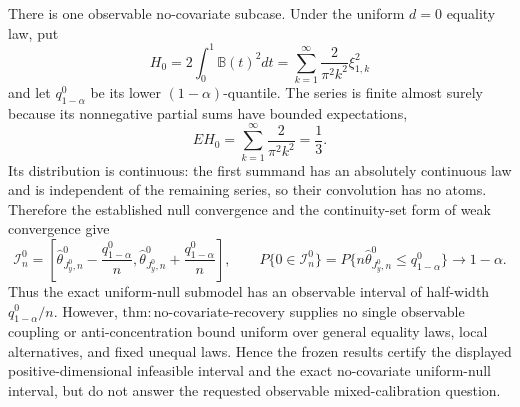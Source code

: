 There is one observable no-covariate subcase.  Under the uniform \(d=0\) equality law, put
\[
H_0=2\int_0^1\mathbb B(t)^2dt
=\sum_{k=1}^{\infty}\frac{2}{\pi^2k^2}\xi_{1,k}^2
\]
and let \(q^0_{1-\alpha}\) be its lower \((1-\alpha)\)-quantile.  The series is finite almost surely because its nonnegative partial sums have bounded expectations,
\[
E H_0=\sum_{k=1}^{\infty}\frac{2}{\pi^2k^2}=\frac13.
\]
Its distribution is continuous: the first summand has an absolutely continuous law and is independent of the remaining series, so their convolution has no atoms.  Therefore the established null convergence and the continuity-set form of weak convergence give
\[
\mathcal I_n^0=
\left[\widehat\theta^0_{J_y^0,n}-\frac{q^0_{1-\alpha}}n,
\widehat\theta^0_{J_y^0,n}+\frac{q^0_{1-\alpha}}n\right],
\qquad
P\{0\in\mathcal I_n^0\}
=P\{n\widehat\theta^0_{J_y^0,n}\le q^0_{1-\alpha}\}
\longrightarrow1-\alpha.
\]
Thus the exact uniform-null submodel has an observable interval of half-width \(q^0_{1-\alpha}/n\).  However, \(\mathrm{thm{:}no\text{-}covariate\text{-}recovery}\) supplies no single observable coupling or anti-concentration bound uniform over general equality laws, local alternatives, and fixed unequal laws.  Hence the frozen results certify the displayed positive-dimensional infeasible interval and the exact no-covariate uniform-null interval, but do not answer the requested observable mixed-calibration question.
